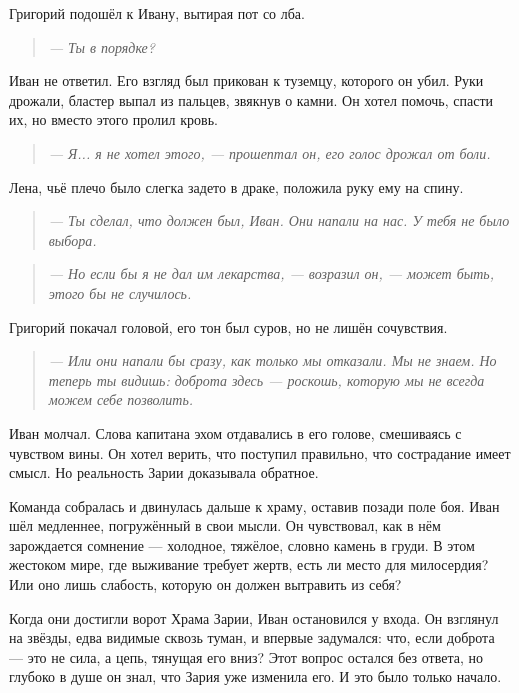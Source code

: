\documentclass[12pt,a4paper]{book} %
\newenvironment{dialogue}{\begin{quote}\itshape}{\end{quote}}
\begin{document}
Григорий подошёл к Ивану, вытирая пот со лба.

\begin{dialogue}
--- Ты в порядке?
\end{dialogue}

Иван не ответил. Его взгляд был прикован к туземцу, которого он убил. Руки дрожали, бластер выпал из пальцев, звякнув о камни. Он хотел помочь, спасти их, но вместо этого пролил кровь.

\begin{dialogue}
--- Я... я не хотел этого, --- прошептал он, его голос дрожал от боли.
\end{dialogue}

Лена, чьё плечо было слегка задето в драке, положила руку ему на спину.

\begin{dialogue}
--- Ты сделал, что должен был, Иван. Они напали на нас. У тебя не было выбора.
\end{dialogue}

\begin{dialogue}
--- Но если бы я не дал им лекарства, --- возразил он, --- может быть, этого бы не случилось.
\end{dialogue}

Григорий покачал головой, его тон был суров, но не лишён сочувствия.

\begin{dialogue}
--- Или они напали бы сразу, как только мы отказали. Мы не знаем. Но теперь ты видишь: доброта здесь --- роскошь, которую мы не всегда можем себе позволить.
\end{dialogue}

Иван молчал. Слова капитана эхом отдавались в его голове, смешиваясь с чувством вины. Он хотел верить, что поступил правильно, что сострадание имеет смысл. Но реальность Зарии доказывала обратное.

Команда собралась и двинулась дальше к храму, оставив позади поле боя. Иван шёл медленнее, погружённый в свои мысли. Он чувствовал, как в нём зарождается сомнение --- холодное, тяжёлое, словно камень в груди. В этом жестоком мире, где выживание требует жертв, есть ли место для милосердия? Или оно лишь слабость, которую он должен вытравить из себя?

Когда они достигли ворот Храма Зарии, Иван остановился у входа. Он взглянул на звёзды, едва видимые сквозь туман, и впервые задумался: что, если доброта --- это не сила, а цепь, тянущая его вниз? Этот вопрос остался без ответа, но глубоко в душе он знал, что Зария уже изменила его. И это было только начало.
\end{document}
